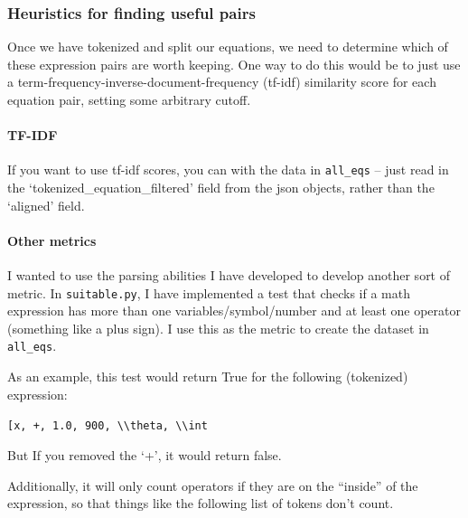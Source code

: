 \documentclass[]{article}
\let\oldparagraph\paragraph
\renewcommand{\paragraph}[1]{\oldparagraph{#1}\mbox{}}
\begin{document}
\hypertarget{heuristics-for-finding-useful-pairs}{%
\subsubsection{Heuristics for finding useful
pairs}\label{heuristics-for-finding-useful-pairs}}

Once we have tokenized and split our equations, we need to determine
which of these expression pairs are worth keeping. One way to do this
would be to just use a term-frequency-inverse-document-frequency
(tf-idf) similarity score for each equation pair, setting some arbitrary
cutoff.

\hypertarget{tf-idf}{%
\paragraph{TF-IDF}\label{tf-idf}}

If you want to use tf-idf scores, you can with the data in
\texttt{all\_eqs} -- just read in the `tokenized\_equation\_filtered'
field from the json objects, rather than the `aligned' field.

\hypertarget{other-metrics}{%
\paragraph{Other metrics}\label{other-metrics}}

I wanted to use the parsing abilities I have developed to develop
another sort of metric. In \texttt{suitable.py}, I have implemented a
test that checks if a math expression has more than one
variables/symbol/number and at least one operator (something like a plus
sign). I use this as the metric to create the dataset in
\texttt{all\_eqs}.

As an example, this test would return True for the following (tokenized)
expression:

\texttt{{[}\textquotesingle{}x\textquotesingle{},\ \textquotesingle{}+\textquotesingle{},\ \textquotesingle{}1.0\textquotesingle{},\ \textquotesingle{}900\textquotesingle{},\ \textquotesingle{}\textbackslash{}\textbackslash{}theta\textquotesingle{},\ \textquotesingle{}\textbackslash{}\textbackslash{}int\textquotesingle{}{]}}

But If you removed the `+', it would return false.

Additionally, it will only count operators if they are on the ``inside''
of the expression, so that things like the following list of tokens
don't count.
\end{document}

